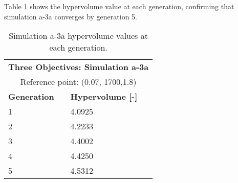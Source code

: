 Table \ref{tab:a3a-hypervolume} shows the hypervolume value at each generation, 
confirming that simulation a-3a converges by generation 5. 
\begin{table}[htbp!]
    \centering
    \onehalfspacing
    \caption{Simulation a-3a hypervolume values at each generation.}
	\label{tab:a3a-hypervolume}
    \footnotesize
    \begin{tabular}{ll}
    \hline 
    \multicolumn{2}{c}{\textbf{Three Objectives: Simulation a-3a}} \\
    \multicolumn{2}{c}{Reference point: (0.07, 1700,1.8)} \\
    \hline 
    \textbf{Generation} & \textbf{Hypervolume [-]} \\
    \hline
    1 & 4.0925 \\
    2 & 4.2233 \\
    3 & 4.4002 \\
    4 & 4.4250 \\
    5 & 4.5312 \\
    \hline
    \end{tabular}
\end{table}

